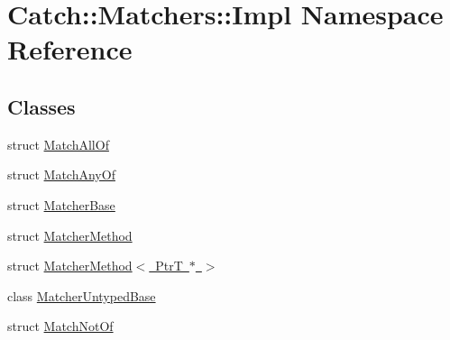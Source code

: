 \hypertarget{namespaceCatch_1_1Matchers_1_1Impl}{}\section{Catch\+:\+:Matchers\+:\+:Impl Namespace Reference}
\label{namespaceCatch_1_1Matchers_1_1Impl}
\subsection*{Classes}
\begin{DoxyCompactItemize}
\item 
struct \mbox{\hyperlink{structCatch_1_1Matchers_1_1Impl_1_1MatchAllOf}{Match\+All\+Of}}
\item 
struct \mbox{\hyperlink{structCatch_1_1Matchers_1_1Impl_1_1MatchAnyOf}{Match\+Any\+Of}}
\item 
struct \mbox{\hyperlink{structCatch_1_1Matchers_1_1Impl_1_1MatcherBase}{Matcher\+Base}}
\item 
struct \mbox{\hyperlink{structCatch_1_1Matchers_1_1Impl_1_1MatcherMethod}{Matcher\+Method}}
\item 
struct \mbox{\hyperlink{structCatch_1_1Matchers_1_1Impl_1_1MatcherMethod_3_01PtrT_01_5_01_4}{Matcher\+Method$<$ Ptr\+T $\ast$ $>$}}
\item 
class \mbox{\hyperlink{classCatch_1_1Matchers_1_1Impl_1_1MatcherUntypedBase}{Matcher\+Untyped\+Base}}
\item 
struct \mbox{\hyperlink{structCatch_1_1Matchers_1_1Impl_1_1MatchNotOf}{Match\+Not\+Of}}
\end{DoxyCompactItemize}
